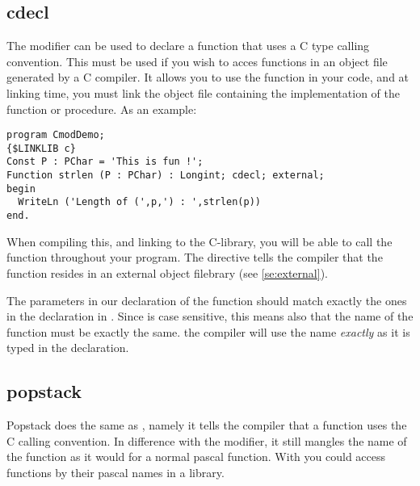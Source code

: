 \documentclass{report}
\begin{document}
\subsection{cdecl}
\label{se:cdecl}
The  modifier can be used to declare a function that uses a C
type calling convention. This must be used if you wish to acces functions in
an object file generated by a C compiler. It allows you to use the function in
your code, and at linking time, you must link the object file containing the
 implementation of the function or procedure.
As an example:
\begin{verbatim}
program CmodDemo;
{$LINKLIB c}
Const P : PChar = 'This is fun !';
Function strlen (P : PChar) : Longint; cdecl; external;
begin
  WriteLn ('Length of (',p,') : ',strlen(p))
end.
\end{verbatim}
When compiling this, and linking to the C-library, you will be able to call
the  function throughout your program. The 
directive tells the compiler that the function resides in an external
object filebrary (see \ref{se:external}).
\begin{remark} 
The parameters in our declaration of the  function should
match exactly the ones in the declaration in . Since  is case
sensitive, this means also that the name of the
function must be exactly the same. the \fpc compiler will use the name {\em
exactly} as it is typed in the declaration.
\end{remark}
\subsection{popstack}
\label{se:popstack}
Popstack does the same as , namely it tells the \fpc compiler
that a function uses the C calling convention. In difference with the
 modifier, it still mangles the name of the function as it would
for a normal pascal function.
With  you could access functions by their pascal names in a
library.
\end{document}
